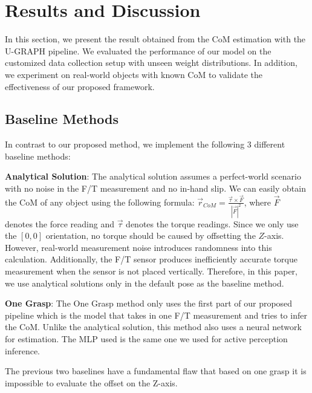 \section{Results and Discussion}

In this section, we present the result obtained from the CoM estimation with the U-GRAPH pipeline. We evaluated the performance of our model on the customized data collection setup with unseen weight distributions. In addition, we experiment on real-world objects with known CoM to validate the effectiveness of our proposed framework. 

\subsection{Baseline Methods}%
In contrast to our proposed method, we implement the following 3 different baseline methods:

\textbf{Analytical Solution}: The analytical solution assumes a perfect-world scenario with no noise in the F/T measurement and no in-hand slip. We can easily obtain the CoM of any object using the following formula: $\Vec{r}_{CoM} = \frac{\Vec{\tau} \times \Vec{F}}{|\Vec{F}|^2}$,
where $\Vec{F}$ denotes the force reading and $\Vec{\tau}$ denotes the torque readings. Since we only use the $[0,0]$ orientation, no torque should be caused by offsetting the $Z$-axis. However, real-world measurement noise introduces randomness into this calculation. Additionally, the F/T sensor produces inefficiently accurate torque measurement when the sensor is not placed vertically. Therefore, in this paper, we use analytical solutions only in the default pose as the baseline method.


\textbf{One Grasp}: The One Grasp method only uses the first part of our proposed pipeline which is the model that takes in one F/T measurement and tries to infer the CoM. Unlike the analytical solution, this method also uses a neural network for estimation. The MLP used is the same one we used for active perception inference. %

The previous two baselines have a fundamental flaw that based on one grasp it is impossible to evaluate the offset on the Z-axis.

